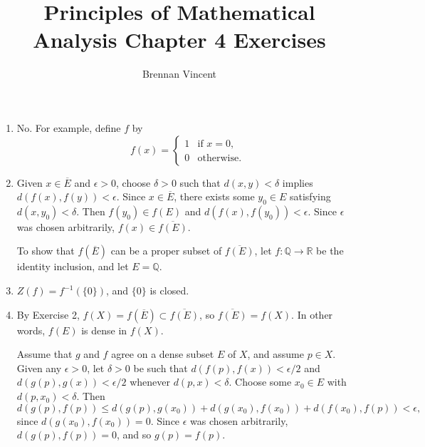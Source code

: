 \documentclass{article}
\title{Principles of Mathematical Analysis Chapter 4 Exercises}
\author{Brennan Vincent}
\begin{document}
\maketitle
\begin{enumerate}[label=\textbf{\arabic*.}]
\item No. For example, define $f$ by \[
f(x) = \begin{cases}
	1 & \text{if } x = 0,\\
	0 & \text{otherwise}.
\end{cases}\]
\item Given $x\in \overline E$ and $\epsilon >0$, choose $\delta > 0$ such that $d(x,y) < \delta$ implies $d(f(x),f(y)) < \epsilon$. Since $x\in \overline E$, there exists some $y_0\in E$ satisfying $d(x,y_0) < \delta$. Then $f(y_0)\in f(E)$ and $d(f(x),f(y_0))<\epsilon$. Since $\epsilon$ was chosen arbitrarily, $f(x)\in \overline{f(E)}$.

To show that $f(\overline E)$ can be a proper subset of $\overline{f(E)}$, let $f:\mathbb Q\to \mathbb R$ be the identity inclusion, and let $E=\mathbb Q$.
\item $Z(f) = f^{-1}(\{0\})$, and $\{0\}$ is closed.
\item By Exercise 2, $f(X) = f(\overline E) \subset \overline {f(E)}$, so $\overline{f(E)} = f(X)$. In other words, $f(E)$ is dense in $f(X)$.

Assume that $g$ and $f$ agree on a dense subset $E$ of $X$, and assume $p\in X$. Given any $\epsilon > 0$, let $\delta > 0$ be such that $d(f(p),f(x)) < \epsilon/2$ and $d(g(p),g(x)) < \epsilon/2$ whenever $d(p,x) < \delta$. Choose some $x_0\in E$ with $d(p,x_0) < \delta$. Then \[d(g(p),f(p)) \leq d(g(p),g(x_0)) + d(g(x_0),f(x_0)) + d(f(x_0),f(p)) < \epsilon,\] since $d(g(x_0),f(x_0))=0$. Since $\epsilon$ was chosen arbitrarily, $d(g(p),f(p)) = 0$, and so $g(p) = f(p)$.
\end{enumerate}
\end{document}
